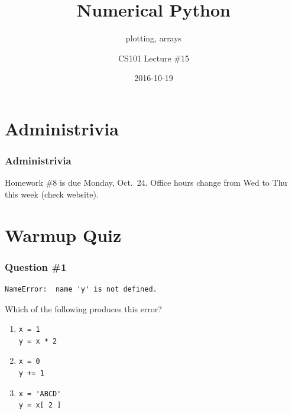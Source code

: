 \documentclass[11pt]{beamer}
\title{Numerical Python}
\subtitle{plotting, arrays}
\author{CS101 Lecture \#15}
\date{2016-10-19}
\begin{document}
  \setcounter{showProgressBar}{0}
  \setcounter{showSlideNumbers}{0}

\frame{\titlepage}

\setcounter{framenumber}{0}
\setcounter{showProgressBar}{1}
\setcounter{showSlideNumbers}{1}

\section{Administrivia}

\begin{frame}
  \frametitle{Administrivia}
  \Enlarge

  \begin{itemize}
  \myitem  Homework \#8 is due Monday, Oct.\ 24.
  \myitem  Office hours change from Wed to Thu this week (check website).
  \end{itemize}
\end{frame}

\section{Warmup Quiz}

\begin{frame}[fragile]
  \frametitle{Question \#1}
  \Enlarge

  \begin{Verbatim}
NameError:  name 'y' is not defined.
  \end{Verbatim}

  Which of the following produces this error?

  \begin{enumerate}[label=\Alph*]
  \item
  \begin{Verbatim}
x = 1
y = x * 2
  \end{Verbatim}
  \item
  \begin{Verbatim}
x = 0
y += 1
  \end{Verbatim}
  \item
  \begin{Verbatim}
x = 'ABCD'
y = x[ 2 ]
  \end{Verbatim}
  \end{enumerate}
\end{frame}
\end{document}
